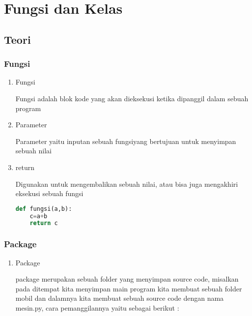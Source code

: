 \chapter{Fungsi dan Kelas}

\section{Teori}
\subsection{Fungsi}
\begin{enumerate}
\item Fungsi 
\par 
Fungsi adalah blok kode yang akan dieksekusi ketika dipanggil dalam sebuah program
\item Parameter 
\par 
Parameter yaitu inputan sebuah fungsiyang bertujuan untuk menyimpan sebuah nilai
\item return 
\par 
Digunakan untuk mengembalikan sebuah nilai, atau bisa juga mengakhiri eksekusi sebuah fungsi
\begin{lstlisting}[language=Python]
def fungsi(a,b):
	c=a+b
	return c
\end{lstlisting}
\end{enumerate}

\subsection{Package}
\begin{enumerate}
\item Package
\par 
package merupakan sebuah folder yang menyimpan source code, misalkan pada ditempat kita menyimpan main program kita membuat sebuah folder mobil dan dalamnya kita membuat sebuah source code dengan nama mesin.py, cara pemanggilannya yaitu sebagai berikut :

\end{enumerate}

